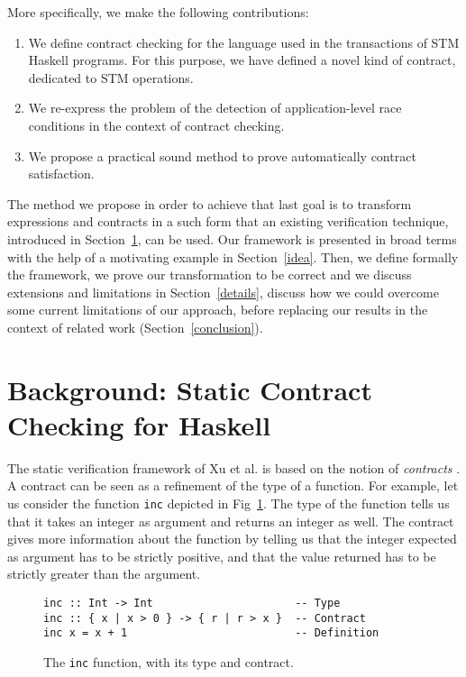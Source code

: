 \documentclass[submission,copyright,creativecommons]{eptcs}
\begin{document}
More specifically, we make the following contributions:
\begin{enumerate}
\item We define contract checking for the language used in the transactions of STM Haskell programs. For this purpose, we have defined a novel kind of contract, dedicated to STM operations. 
\item We re-express the problem of the detection of application-level race conditions in the context of contract checking.
\item We propose a practical sound method to prove automatically contract satisfaction.
\end{enumerate}
The method we propose in order to achieve that last goal is to transform expressions and contracts in a such form that an existing verification technique, introduced in Section~\ref{background}, can be used.
Our framework is presented in broad terms with the help of a motivating example in Section~\ref{idea}. Then, we define formally the framework, we prove our transformation to be correct and we discuss extensions and limitations in Section~\ref{details},  
discuss how we could overcome some current limitations of our approach, 
before replacing our results in the context of related work (Section~\ref{conclusion}).



\section{Background: Static Contract Checking for Haskell}
\label{background}

The static verification framework of Xu et al.\cite{static-contract-checking} is based on the notion of \emph{contracts} \cite{eiffel-language,spec-programming-system}. 
A contract can be seen as a refinement of the type of a function. 
For example, let us consider the function \texttt{inc} depicted in Fig~\ref{fig:inc}. 
The type of the function tells us that it takes an integer as argument and returns an integer as well.
The contract gives more information about the function by telling us that the integer expected as argument has to be strictly positive,
and that the value returned has to be strictly greater than the argument. 

\begin{figure}[htb]
  \centering
  \begin{footnotesize}
\begin{verbatim}
inc :: Int -> Int                      -- Type
inc :: { x | x > 0 } -> { r | r > x }  -- Contract
inc x = x + 1                          -- Definition
\end{verbatim}
  \end{footnotesize}
  \caption{The \texttt{inc} function, with its type and contract.}
  \label{fig:inc}
\end{figure}
\end{document}
